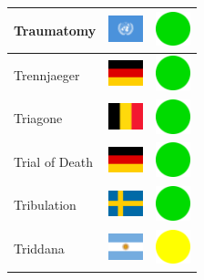 \documentclass[12pt, a4paper, twoside]{report}
\begin{document}
\begin{center}
\begin{longtable}{|p{5cm}|p{2cm}|p{2cm}|}
 Traumatomy                                                 & \includegraphics[width=1cm]{../img/flags/un} &   \includegraphics[width=1cm]{../likes/y} \\ \hline
 Trennjaeger                                                & \includegraphics[width=1cm]{../img/flags/de} &   \includegraphics[width=1cm]{../likes/y} \\ \hline
 Triagone                                                   & \includegraphics[width=1cm]{../img/flags/be} &   \includegraphics[width=1cm]{../likes/y} \\ \hline
 Trial of Death                                             & \includegraphics[width=1cm]{../img/flags/de} &   \includegraphics[width=1cm]{../likes/y} \\ \hline
 Tribulation                                                & \includegraphics[width=1cm]{../img/flags/se} &   \includegraphics[width=1cm]{../likes/y} \\ \hline
 Triddana                                                   & \includegraphics[width=1cm]{../img/flags/ar} &   \includegraphics[width=1cm]{../likes/m} \\ \hline

\end{longtable}
\end{center}
\end{document}
